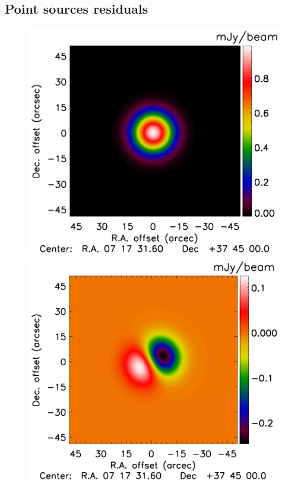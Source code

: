 \documentclass[twocolumn,traditabstract]{aa}
\begin{document}
\subsection{Point sources residuals}
\begin{figure}[h]
\centering
\includegraphics[trim=0cm 0.7cm 0cm 0cm, clip=true, totalheight=3.4cm]{Figure/PSalone_Input_PointSource_15_15_45.pdf}
\includegraphics[trim=0cm 0.7cm 0cm 0cm, clip=true, totalheight=3.4cm]{Figure/PSalone_Input_PointSourceResidual_15_15_45.pdf}

\end{figure}
\end{document}
